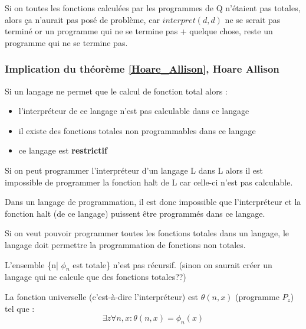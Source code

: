 \begin{myrem}
	Si on toutes les fonctions calculées par les programmes de Q n'étaient
	pas totales, alors ça n'aurait pas posé de problème, car $interpret(d,d)$
	ne se serait pas terminé or un programme qui ne se termine pas +
	quelque chose, reste un programme qui ne se termine pas.
\end{myrem}



\subsubsection{Implication du théorème \ref{Hoare_Allison}, Hoare Allison }

\begin{myprop}
	Si un langage ne permet que le calcul de fonction total alors :
	\begin{itemize}
		\item l'interpréteur de ce langage n'est pas calculable dans ce langage
		\item il existe des fonctions totales non programmables dans ce langage
		\item ce langage est \bf{restrictif}
	\end{itemize}
\end{myprop}
	
\begin{myprop}
	Si on peut programmer l'interpréteur d'un langage L dans L alors il est
	impossible de programmer la fonction halt de L car celle-ci n'est pas calculable. 
\end{myprop}

\begin{myprop}
	Dans un langage de programmation, il est donc impossible que 
	l'interpréteur et la fonction halt (de ce langage) puissent être programmés dans ce langage.
\end{myprop}

\begin{myprop}
	Si on veut pouvoir programmer toutes les fonctions 
	totales dans un langage, le langage doit permettre la programmation de 
	fonctions non totales.
\end{myprop}

\begin{myprop}
	L'ensemble \{n| $\phi_n$ est totale\} n'est pas récursif. (sinon on 
	saurait créer un langage qui ne calcule que des fonctions totales??)
\end{myprop}

\begin{mytheo}
	La fonction universelle (c'est-à-dire l'interpréteur) est $\theta(n,x)$ (programme $P_z$) tel que :
	\[ \exists z \forall n,x : \theta(n,x) = \phi_n(x)\]	
\end{mytheo}

